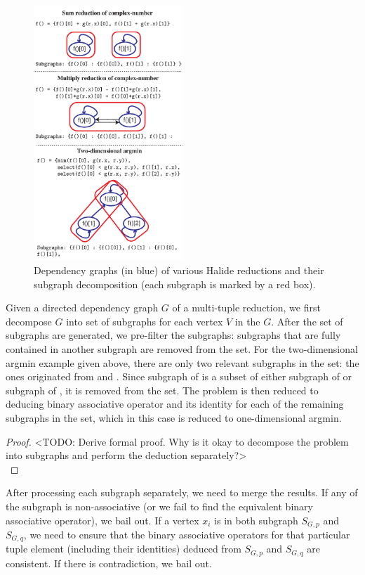 \begin{figure}
\centering
\includegraphics[width=0.5\textwidth]{subgraphs}
\caption{Dependency graphs (in blue) of various Halide reductions and their subgraph decomposition (each subgraph is marked by a red box).}
\label{fig:subgraphs_decomposition}
\end{figure}

Given a directed dependency graph $G$ of a multi-tuple reduction, we first decompose $G$ into set of subgraphs for each vertex $V$ in the $G$. After the set of subgraphs are generated, we pre-filter the subgraphs: subgraphs that are fully contained in another subgraph are removed from the set. For the two-dimensional argmin example given above, there are only two relevant subgraphs in the set: the ones originated from  and . Since subgraph of  is a subset of either subgraph of  or subgraph of , it is removed from the set. The problem is then reduced to deducing binary associative operator and its identity for each of the remaining subgraphs in the set, which in this case is reduced to one-dimensional argmin. 

\begin{proof}
<TODO: Derive formal proof. Why is it okay to decompose the problem into subgraphs and perform the deduction separately?> \\
\end{proof}

After processing each subgraph separately, we need to merge the results. If any of the subgraph is non-associative (or we fail to find the equivalent binary associative operator), we bail out. If a vertex $x_i$ is in both subgraph $S_{G, p}$ and $S_{G, q}$, we need to ensure that the binary associative operators for that particular tuple element (including their identities) deduced from $S_{G, p}$ and $S_{G, q}$ are consistent. If there is contradiction, we bail out.  

